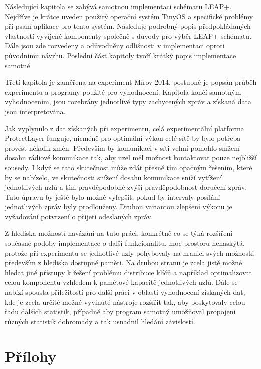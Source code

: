 \documentclass[11pt,final,twoside]{fithesis2}
\begin{document}
Následující kapitola se zabývá samotnou implementací schématu LEAP+. Nejdříve je krátce uveden použitý operační systém TinyOS a specifické problémy při psaní aplikace pro tento systém. Následuje podrobný 
popis předpokládaných vlastností vyvíjené komponenty společně s důvody pro výběr LEAP+ schématu. Dále jsou zde rozvedeny a odůvodněny odlišnosti v implementaci oproti původnímu návrhu. Poslední část kapitoly 
tvoří krátký popis implementace samotné. 

Třetí kapitola je zaměřena na experiment Mírov 2014, postupně je popsán průběh experimentu a programy použité pro vyhodnocení. Kapitola končí samotným vyhodnocením, jsou rozebrány jednotlivé typy zachycených 
zpráv a získaná data jsou interpretována. 

Jak vyplynulo z dat získaných při experimentu, celá experimentální platforma ProtectLayer funguje, nicméně pro optimální výkon celé sítě by bylo potřeba provést několik změn. Především by komunikaci v síti 
velmi pomohlo snížení dosahu rádiové komunikace tak, aby uzel měl možnost kontaktovat pouze nejbližší sousedy. I když se tato skutečnost může zdát přesně tím opačným řešením, které by se nabízelo, ve 
skutečnosti snížení dosahu komunikace sníží vytížení jednotlivých uzlů a tím pravděpodobně zvýší pravděpodobnost doručení zpráv. Tuto úpravu by ještě bylo možné vylepšit, pokud by intervaly posílání 
jednotlivých zpráv byly prodlouženy. Druhou variantou zlepšení výkonu je vyžadování potvrzení o přijetí odeslaných zpráv.

Z hlediska možností navázání na tuto práci, konkrétně co se týká rozšíření současné podoby implementace o další funkcionalitu, moc prostoru nenaskýtá, protože při experimentu se jednotlivé uzly pohybovaly 
na hranici svých možností, především z hlediska dostupné paměti. Na druhou stranu je zcela jistě možné hledat jiné přístupy k řešení problému distribuce klíčů a například 
optimalizovat celou komponentu vzhledem k paměťové kapacitě jednotlivých uzlů.
Dále se nabízí spousta příležitostí pro další práci v oblasti vyhodnocení získaných dat, kde je zcela určitě možné vyvinuté nástroje rozšířit 
tak, aby poskytovaly celou řadu dalších statistik, případně aby program samotný umožňoval propojení různých statistik dohromady a tak usnadnil hledání závislostí.


\appendix

\chapter{Přílohy}
\end{document}
